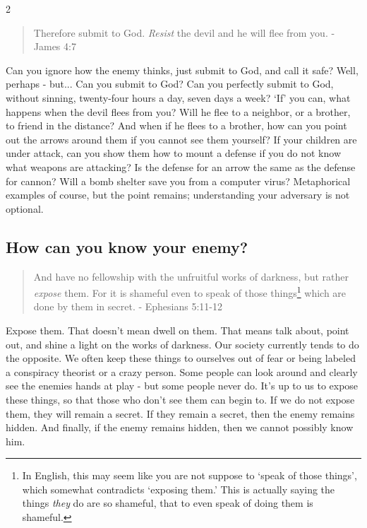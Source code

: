 \documentclass[10pt]{article}
\begin{document}
\begin{multicols}{2}
\begin{quotation}
Therefore submit to God. \textit{Resist} the devil and he will flee from you. - James 4:7
\end{quotation}

Can you ignore how the enemy thinks, just submit to God, and call it safe? Well, perhaps - but... Can you submit to God? Can you perfectly submit to God, without sinning, twenty-four hours a day, seven days a week? `If' you can, what happens when the devil flees from you? Will he flee to a neighbor, or a brother, to friend in the distance? And when if he flees to a brother, how can you point out the arrows around them if you cannot see them yourself? If your children are under attack, can you show them how to mount a defense if you do not know what weapons are attacking? Is the defense for an arrow the same as the defense for cannon? Will a bomb shelter save you from a computer virus? Metaphorical examples of course, but the point remains; understanding your adversary is not optional.









\subsection*{How can you know your enemy?}

\begin{quotation}
And have no fellowship with the unfruitful works of darkness, but rather \textit{expose} them. For it is shameful even to speak of those things\footnote{In English, this may seem like you are not suppose to `speak of those things', which somewhat contradicts `exposing them.' This is actually saying the things \textit{they} do are so shameful, that to even speak of doing them is shameful.} which are done by them in secret. - Ephesians 5:11-12
\end{quotation}

Expose them. That doesn't mean dwell on them. That means talk about, point out, and shine a light on the works of darkness. Our society currently tends to do the opposite. We often keep these things to ourselves out of fear or being labeled a conspiracy theorist or a crazy person. Some people can look around and clearly see the enemies hands at play - but some people never do. It's up to us to expose these things, so that those who don't see them can begin to. If we do not expose them, they will remain a secret. If they remain a secret, then the enemy remains hidden. And finally, if the enemy remains hidden, then we cannot possibly know him.


\end{multicols}
\end{document}
